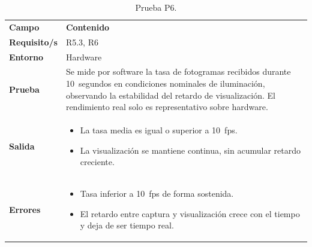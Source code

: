 \documentclass[../main.tex]{subfiles}
\begin{document}
\begin{table}[H]
\centering
\caption{Prueba P6.}
\label{tab:prueba_p6}
\begin{tabular}{>{\raggedright\arraybackslash}p{2.5cm}>{\raggedright\arraybackslash}p{11cm}}
\rowcolor[HTML]{156082}
{\color{white}\textbf{Campo}} & {\color{white}\textbf{Contenido}} \\
\rowcolor[HTML]{C0E6F5}
\textbf{Requisito/s} & R5.3, R6 \\
\textbf{Entorno} & Hardware \\
\rowcolor[HTML]{C0E6F5}
\textbf{Prueba} & Se mide por software la tasa de fotogramas recibidos durante 10~segundos en condiciones nominales de iluminación, observando la estabilidad del retardo de visualización. El rendimiento real solo es representativo sobre hardware. \\
\textbf{Salida} & \begin{itemize}\setlength{\itemsep}{0pt}
    \item La tasa media es igual o superior a 10~fps.
    \item La visualización se mantiene continua, sin acumular retardo creciente.
\end{itemize} \\
\rowcolor[HTML]{C0E6F5}
\textbf{Errores} & \begin{itemize}\setlength{\itemsep}{0pt}
    \item Tasa inferior a 10~fps de forma sostenida.
    \item El retardo entre captura y visualización crece con el tiempo y deja de ser tiempo real.
\end{itemize} \\
\end{tabular}
\end{table}
\end{document}

